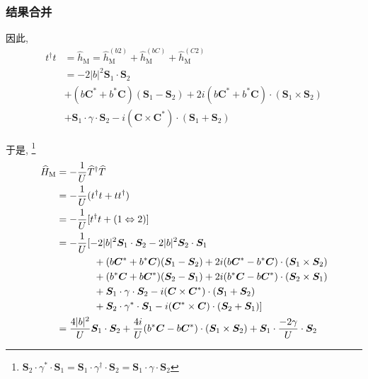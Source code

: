 \documentclass[a4paper, 12pt]{article}
\begin{document}
\subsubsection{结果合并}
因此,
\begin{equation}
  \begin{aligned}
    t^\dagger{}t &= \widehat{h}_{\text{M}} = \widehat{h}_{\text{M}}^{(b2)} + \widehat{h}_{\text{M}}^{(bC)} + \widehat{h}_{\text{M}}^{(C2)}\\
    &= -2|b|^2\bm{S}_1\cdot\bm{S}_2\\
    &+ (b\bm{C}^*+b^*\bm{C})(\bm{S}_1 - \bm{S}_2) + 2i(b\bm{C}^*+b^*\bm{C})\cdot(\bm{S}_1\times\bm{S}_2)\\
    &+ \bm{S}_1\cdot\gamma\cdot\bm{S}_2 -i (\bm{C}\times\bm{C}^*)\cdot(\bm{S}_1+\bm{S}_2)
  \end{aligned}
\end{equation}

于是, \footnote{\(\bm{S}_2\cdot\gamma^*\cdot\bm{S}_1 = \bm{S}_1\cdot\gamma^\dagger\cdot\bm{S}_2 = \bm{S}_1\cdot\gamma\cdot\bm{S}_2\)}
\begin{equation}
  \begin{aligned}
    \widehat{H}_{\text{M}} &= -\frac{1}{U} \widehat{T}^\dagger\widehat{T}\\
    &= -\frac{1}{U} (t^\dagger{}t+tt^\dagger)\\
    &= -\frac{1}{U} [t^\dagger{}t+(1\Leftrightarrow2)]\\
    &= -\frac{1}{U} [-2|b|^2\bm{S}_1\cdot\bm{S}_2 -2|b|^2\bm{S}_2\cdot\bm{S}_1 \\
    &\hspace*{38pt}+ (b\bm{C}^*+b^*\bm{C})(\bm{S}_1 - \bm{S}_2) + 2i(b\bm{C}^*-b^*\bm{C})\cdot(\bm{S}_1\times\bm{S}_2)\\
    &\hspace*{38pt}+ (b^*\bm{C}+b\bm{C}^*)(\bm{S}_2 - \bm{S}_1) + 2i(b^*\bm{C}-b\bm{C}^*)\cdot(\bm{S}_2\times\bm{S}_1)\\
    &\hspace*{38pt}+ \bm{S}_1\cdot\gamma\cdot\bm{S}_2 -i (\bm{C}\times\bm{C}^*)\cdot(\bm{S}_1+\bm{S}_2)\\
    &\hspace*{38pt}+ \bm{S}_2\cdot\gamma^*\cdot\bm{S}_1 -i (\bm{C}^*\times\bm{C})\cdot(\bm{S}_2+\bm{S}_1)]\\
    &= \frac{4|b|^2}{U}\bm{S}_1\cdot\bm{S}_2 + \frac{4i}{U}(b^*\bm{C}-b\bm{C}^*)\cdot(\bm{S}_1\times\bm{S}_2) + \bm{S}_1\cdot\frac{-2\gamma}{U}\cdot\bm{S}_2
  \end{aligned}
\end{equation}
\end{document}
